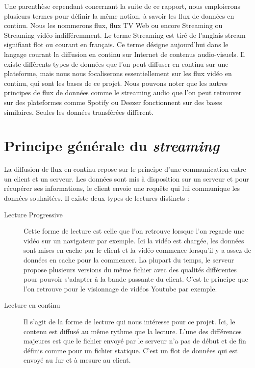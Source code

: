 \documentclass{polytech/polytech}
\begin{document}
Une parenthèse cependant concernant la suite de ce rapport, nous emploierons plusieurs termes pour définir la même notion, à savoir les flux de données en continu. Nous les nommerons flux, flux TV Web ou encore Streaming ou Streaming vidéo indifféremment. Le terme Streaming est tiré de l’anglais stream signifiant flot ou courant en français. Ce terme désigne aujourd’hui dans le langage courant la diffusion en continu sur Internet de contenus audio-visuels. Il existe différents types de données que l’on peut diffuser en continu sur une plateforme, mais nous nous focaliserons essentiellement sur les flux vidéo en continu, qui sont les bases de ce projet. Nous pouvons noter que les autres principes de flux de données comme le streaming audio que l’on peut retrouver sur des plateformes comme Spotify ou Deezer fonctionnent sur des bases similaires. Seules les données transférées diffèrent.

\section{Principe générale du \textit{streaming}}

La diffusion de flux en continu repose sur le principe d’une communication entre un client et un serveur. Les données sont mis à disposition sur un serveur et pour récupérer ses informations, le client envoie une requête qui lui communique les données souhaitées. Il existe deux types de lectures distincts \cite{_definition_2017} :

\begin{description}
	\item[Lecture Progressive] Cette forme de lecture est celle que l’on retrouve lorsque l’on regarde une vidéo sur un navigateur par exemple. Ici la vidéo est chargée, les données sont mises en cache par le client et la vidéo commence lorsqu’il y a assez de données en cache pour la commencer. La plupart du temps, le serveur propose plusieurs versions du même fichier avec des qualités différentes pour pouvoir s’adapter à la bande passante du client. C’est le principe que l’on retrouve pour le visionnage de vidéos Youtube par exemple.
	\item[Lecture en continu] Il s’agit de la forme de lecture qui nous intéresse pour ce projet. Ici, le contenu est diffusé au même rythme que la lecture. L’une des différences majeures est que le fichier envoyé par le serveur n’a pas de début et de fin définis comme pour un fichier statique. C’est un flot de données qui est envoyé au fur et à mesure au client.
\end{description}
\end{document}
